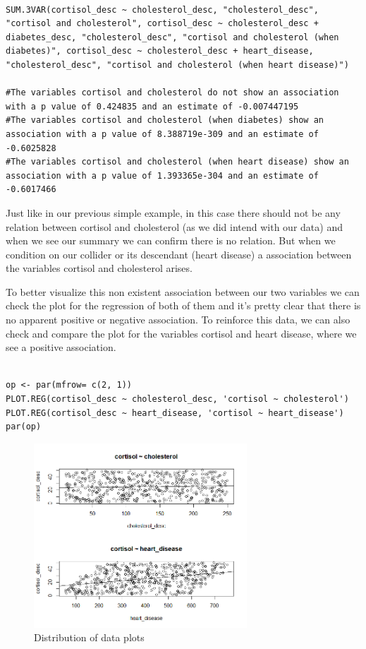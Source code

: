 \documentclass{article}
\begin{document}
\begin{lstlisting}

SUM.3VAR(cortisol_desc ~ cholesterol_desc, "cholesterol_desc", "cortisol and cholesterol", cortisol_desc ~ cholesterol_desc + diabetes_desc, "cholesterol_desc", "cortisol and cholesterol (when diabetes)", cortisol_desc ~ cholesterol_desc + heart_disease, "cholesterol_desc", "cortisol and cholesterol (when heart disease)")

#The variables cortisol and cholesterol do not show an association with a p value of 0.424835 and an estimate of -0.007447195 
#The variables cortisol and cholesterol (when diabetes) show an association with a p value of 8.388719e-309 and an estimate of -0.6025828 
#The variables cortisol and cholesterol (when heart disease) show an association with a p value of 1.393365e-304 and an estimate of -0.6017466 

\end{lstlisting}

Just like in our previous simple example, in this case there should not be any relation between cortisol and cholesterol (as we did intend with our data) and when we see our summary we can confirm there is no relation. But when we  condition on our collider or its descendant (heart disease) a association between the variables cortisol and cholesterol arises.\par
To better visualize this non existent association between our two variables we can check the plot for the regression of both of them and it's pretty clear that there is no apparent positive or negative association. To reinforce this data, we can also check and compare the plot for the variables cortisol and heart disease, where we see a positive association.

\begin{lstlisting}

op <- par(mfrow= c(2, 1))
PLOT.REG(cortisol_desc ~ cholesterol_desc, 'cortisol ~ cholesterol')
PLOT.REG(cortisol_desc ~ heart_disease, 'cortisol ~ heart_disease')
par(op)

\end{lstlisting}

\begin{figure}[h]
\caption{Distribution of data plots}
\includegraphics[width=8cm]{PLOT_CR_CH_HD.png}
\centering
\end{figure}
\end{document}
